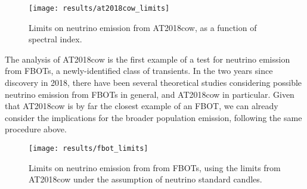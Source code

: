 \begin{figure}[!ht]
	\centering \texttt{[image: results/at2018cow\_limits]}
	\caption{Limits on neutrino emission from AT2018cow, as a function of spectral index.}
	\label{fig:at2018cow_limits}
\end{figure}

The analysis of AT2018cow is the first example of a test for neutrino emission from FBOTs, a newly-identified class of transients. In the two years since discovery in 2018, there have been several theoretical studies considering possible neutrino emission from FBOTs in general, and AT2018cow in particular. Given that AT2018cow is by far the closest example of an FBOT, we can already consider the implications for the broader population emission, following the same procedure above.

\begin{figure}[!ht]
	\centering \texttt{[image: results/fbot\_limits]}
	\caption{Limits on neutrino emission from from FBOTs, using the limits from AT2018cow under the assumption of neutrino standard candles.}
	\label{fig:fbot_limits}
\end{figure}